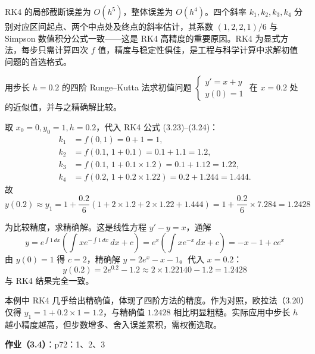 \begin{remark}
RK4 的局部截断误差为 $O(h^5)$，整体误差为 $O(h^4)$。四个斜率 $k_1, k_2, k_3, k_4$ 分别对应区间起点、两个中点处及终点的斜率估计，其系数 $(1, 2, 2, 1)/6$ 与 Simpson 数值积分公式一致——这是 RK4 高精度的重要原因。RK4 为显式方法，每步只需计算四次 $f$ 值，精度与稳定性俱佳，是工程与科学计算中求解初值问题的首选格式。
\end{remark}

\begin{example}
用步长 $h = 0.2$ 的四阶 Runge--Kutta 法求初值问题 $\begin{cases} y' = x + y \\ y(0) = 1 \end{cases}$ 在 $x = 0.2$ 处的近似值，并与之精确解比较。
\end{example}

\begin{solution}
取 $x_0 = 0, y_0 = 1, h = 0.2$，代入 RK4 公式 (3.23)--(3.24)：
$$\begin{aligned} k_1 &= f(0, 1) = 0 + 1 = 1, \\ k_2 &= f(0.1,\, 1 + 0.1) = 0.1 + 1.1 = 1.2, \\ k_3 &= f(0.1,\, 1 + 0.1\times 1.2) = 0.1 + 1.12 = 1.22, \\ k_4 &= f(0.2,\, 1 + 0.2\times 1.22) = 0.2 + 1.244 = 1.444. \end{aligned}$$
故
$$y(0.2) \approx y_1 = 1 + \frac{0.2}{6}(1 + 2\times 1.2 + 2\times 1.22 + 1.444) = 1 + \frac{0.2}{6}\times 7.284 = 1.2428$$

为比较精度，求精确解。这是线性方程 $y' - y = x$，通解
$$y = e^{\int 1\,dx}\left(\int x e^{-\int 1\,dx}\,dx + c\right) = e^x\left(\int x e^{-x}\,dx + c\right) = -x - 1 + ce^x$$
由 $y(0) = 1$ 得 $c = 2$，精确解 $y = 2e^x - x - 1$。代入 $x = 0.2$：
$$y(0.2) = 2e^{0.2} - 1.2 \approx 2\times 1.22140 - 1.2 = 1.2428$$
与 RK4 结果完全一致。
\end{solution}

\begin{remark}
本例中 RK4 几乎给出精确值，体现了四阶方法的精度。作为对照，欧拉法（3.20）仅得 $y_1 = 1 + 0.2\times 1 = 1.2$，与精确值 $1.2428$ 相比明显粗糙。实际应用中步长 $h$ 越小精度越高，但步数增多、舍入误差累积，需权衡选取。
\end{remark}

\textbf{作业（3.4）}：p72：1、2、3
